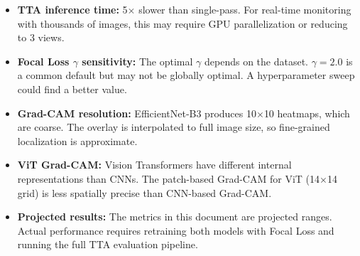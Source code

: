 \documentclass[11pt]{article}
\begin{document}
\begin{itemize}
    \item \textbf{TTA inference time:} 5$\times$ slower than single-pass. For real-time monitoring with thousands of images, this may require GPU parallelization or reducing to 3 views.
    \item \textbf{Focal Loss $\gamma$ sensitivity:} The optimal $\gamma$ depends on the dataset. $\gamma = 2.0$ is a common default but may not be globally optimal. A hyperparameter sweep could find a better value.
    \item \textbf{Grad-CAM resolution:} EfficientNet-B3 produces 10$\times$10 heatmaps, which are coarse. The overlay is interpolated to full image size, so fine-grained localization is approximate.
    \item \textbf{ViT Grad-CAM:} Vision Transformers have different internal representations than CNNs. The patch-based Grad-CAM for ViT (14$\times$14 grid) is less spatially precise than CNN-based Grad-CAM.
    \item \textbf{Projected results:} The metrics in this document are projected ranges. Actual performance requires retraining both models with Focal Loss and running the full TTA evaluation pipeline.
\end{itemize}
\end{document}
